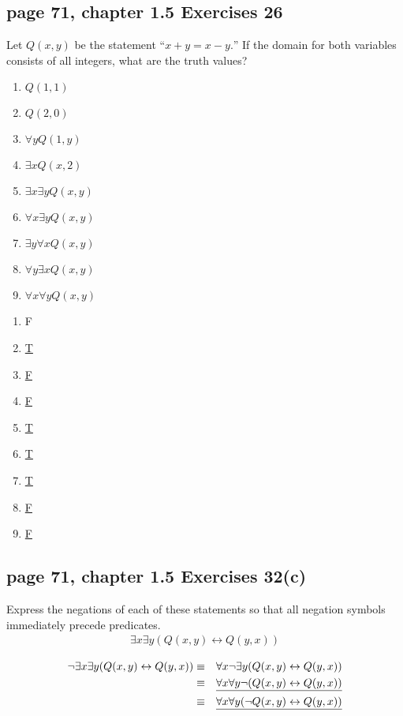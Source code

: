 \documentclass[sigconf]{acmart}
\begin{document}
\subsection{page 71, chapter 1.5 Exercises 26}
\begin{shaded}
    Let $Q(x, y)$ be the statement $“x + y = x - y.”$ If the domain for both variables consists of all integers, what are the truth values?
    \begin{enumerate}[label=(\alph*)]
        \item $Q(1,1)$
        \item $Q(2,0)$
        \item $\forall y Q(1,y)$
        \item $\exists x Q(x,2)$
        \item $\exists x \exists y Q(x,y)$
        \item $\forall x \exists y Q(x,y)$
        \item $\exists y \forall x Q(x,y)$
        \item $\forall y \exists x Q(x,y)$
        \item $\forall x \forall y Q(x,y)$
    \end{enumerate}
\end{shaded} 
\begin{enumerate}[label=(\alph*)]
	\item F
	\item \underline{T}
	\item \underline{F}
	\item \underline{F}
	\item \underline{T}
	\item \underline{T}
	\item \underline{T}
	\item \underline{F}
	\item \underline{F}
\end{enumerate}

\subsection{page 71, chapter 1.5 Exercises 32(c)}
\begin{shaded}
    Express the negations of each of these statements so that all negation symbols immediately precede predicates.
    \begin{eqnarray*}
    	\exists x \exists y (Q(x,y) \leftrightarrow Q(y,x))
    \end{eqnarray*}
\end{shaded} 
\begin{eqnarray*}
	\neg \exists x \exists y (Q(x,y) \leftrightarrow Q(y,x)) & \equiv & \forall x \neg \exists y
	(Q(x,y) \leftrightarrow Q(y,x)) \\
	& \equiv & \text{\underline{$\forall x \forall y \neg (Q(x,y) \leftrightarrow Q(y,x))$}} \\
	& \equiv & \text{\underline{$\forall x \forall y (\neg Q(x,y) \leftrightarrow Q(y,x))$}}
\end{eqnarray*}
\end{document}
